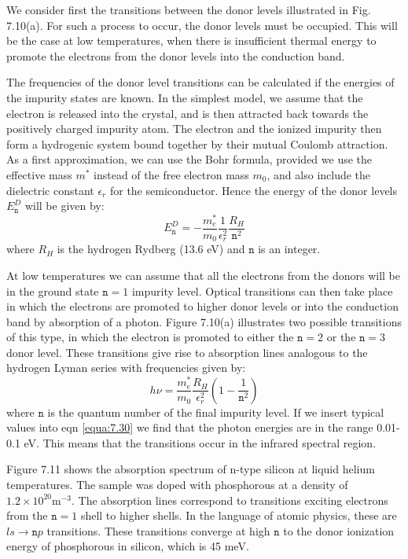 \documentclass[12pt]{book}
\begin{document}
{We consider first the transitions between the donor levels illustrated in Fig. 7.10(a). For such a process to occur, the donor levels must be occupied. This will be the case at low temperatures, when there is insufficient thermal energy to promote the electrons from the donor levels into the  conduction band.

The frequencies of the donor level transitions can be calculated if the energies of the impurity states are known. In the simplest model, we assume that the electron is released into the crystal, and is then attracted back towards the positively charged impurity atom. The electron and the ionized impurity then form a hydrogenic system bound together by their mutual Coulomb attraction. As a first approximation, we can use the Bohr formula, provided we use the effective mass $m^*$ instead of the free electron mass $m_0$, and also include the dielectric constant $\epsilon_r$ for the semiconductor. Hence the energy of the donor levels $E_{\texttt{n}}^D$ will be given by:
\begin{equation}\label{equa:7.29}
  E_{\texttt{n}}^D=-\frac{m_e^*}{m_0}\frac{1}{\epsilon_r^2}\frac{R_H}{\texttt{n}^2}
\end{equation}
where $R_H$ is the hydrogen Rydberg (13.6 eV) and $\texttt{n}$ is an integer.

At low temperatures we can assume that all the electrons from the donors will be in the ground state $\texttt{n} = 1$ impurity level. Optical transitions can then take place in which the electrons are promoted to higher donor levels or into the conduction band by absorption of a photon. Figure 7.10(a) illustrates two possible transitions of this type, in which the electron is promoted to either the $\texttt{n} = 2$ or the $\texttt{n} = 3$ donor level. These transitions give rise to absorption lines analogous to the hydrogen Lyman series with frequencies given by:
\begin{equation}\label{equa:7.30}
  h\nu=\frac{m_e^*}{m_0}\frac{R_H}{\epsilon_r^2}\left(1-\frac{1}{\texttt{n}^2}\right)
\end{equation}
where $\texttt{n}$ is the quantum number of the final impurity level. If we insert typical values into eqn \ref{equa:7.30} we find that the photon energies are in the range 0.01- 0.1 eV. This means that the transitions occur in the infrared spectral region.

Figure 7.11 shows the absorption spectrum of n-type silicon at liquid helium temperatures. The sample was doped with phosphorous at a density of $1.2\times 10^{20} \mathrm{m^{-3}}$. The absorption lines correspond to transitions exciting electrons from the $\texttt{n} = 1$ shell to higher shells. In the language of atomic physics, these are $ls\rightarrow\texttt{n}p$ transitions. These transitions converge at high $\texttt{n}$ to the donor ionization energy of phosphorous in silicon, which is 45 meV.

}
\end{document}
